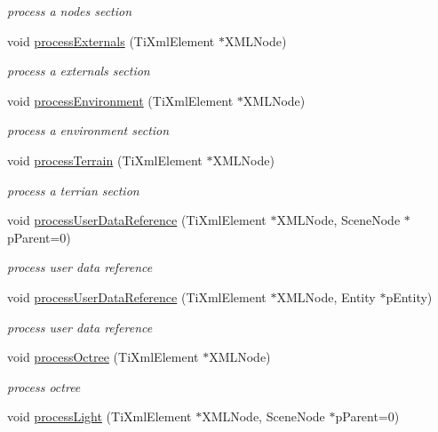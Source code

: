 \begin{DoxyCompactItemize}
\begin{DoxyCompactList}\small\item\em process a nodes section \end{DoxyCompactList}\item 
void \hyperlink{class_ogre_1_1_dot_scene_loader_a1627804a409b0dccd5598323f3d85359}{process\+Externals} (Ti\+Xml\+Element $\ast$X\+M\+L\+Node)
\begin{DoxyCompactList}\small\item\em process a externals section \end{DoxyCompactList}\item 
void \hyperlink{class_ogre_1_1_dot_scene_loader_a6c541dcb42d29071b2556b85f8cd1a62}{process\+Environment} (Ti\+Xml\+Element $\ast$X\+M\+L\+Node)
\begin{DoxyCompactList}\small\item\em process a environment section \end{DoxyCompactList}\item 
void \hyperlink{class_ogre_1_1_dot_scene_loader_ad2f5858edce531f9a7be2e6ebdcebc5e}{process\+Terrain} (Ti\+Xml\+Element $\ast$X\+M\+L\+Node)
\begin{DoxyCompactList}\small\item\em process a terrian section \end{DoxyCompactList}\item 
void \hyperlink{class_ogre_1_1_dot_scene_loader_a24d6db1a195dea881b934753253e8e68}{process\+User\+Data\+Reference} (Ti\+Xml\+Element $\ast$X\+M\+L\+Node, Scene\+Node $\ast$p\+Parent=0)
\begin{DoxyCompactList}\small\item\em process user data reference \end{DoxyCompactList}\item 
void \hyperlink{class_ogre_1_1_dot_scene_loader_a4edd2c7fa8f951f7ecba5d6f8f841330}{process\+User\+Data\+Reference} (Ti\+Xml\+Element $\ast$X\+M\+L\+Node, Entity $\ast$p\+Entity)\hypertarget{class_ogre_1_1_dot_scene_loader_a4edd2c7fa8f951f7ecba5d6f8f841330}{}\label{class_ogre_1_1_dot_scene_loader_a4edd2c7fa8f951f7ecba5d6f8f841330}

\begin{DoxyCompactList}\small\item\em process user data reference \end{DoxyCompactList}\item 
void \hyperlink{class_ogre_1_1_dot_scene_loader_ad23d30b2c6ee9d24dabc89b28d9b61ed}{process\+Octree} (Ti\+Xml\+Element $\ast$X\+M\+L\+Node)
\begin{DoxyCompactList}\small\item\em process octree \end{DoxyCompactList}\item 
void \hyperlink{class_ogre_1_1_dot_scene_loader_a0861154e3d3cdfebdd886116a99d2ea9}{process\+Light} (Ti\+Xml\+Element $\ast$X\+M\+L\+Node, Scene\+Node $\ast$p\+Parent=0)\hypertarget{class_ogre_1_1_dot_scene_loader_a0861154e3d3cdfebdd886116a99d2ea9}{}\label{class_ogre_1_1_dot_scene_loader_a0861154e3d3cdfebdd886116a99d2ea9}


\end{DoxyCompactItemize}

